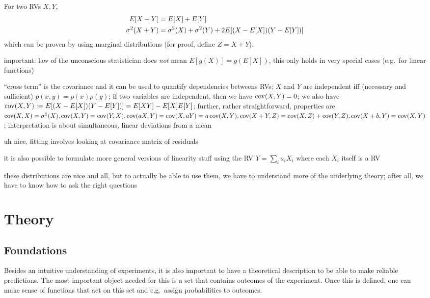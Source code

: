 \begin{prop}
For two RVs $X, Y$,
\begin{align}
E[X + Y] &= E[X] + E[Y]
\\
\sigma^2(X + Y) &= \sigma^2(X) + \sigma^2(Y) + 2 E\qty[(X - E[X]) (Y - E[Y])]
\end{align}
which can be proven by using marginal distributions (for proof, define $Z = X + Y$).
\end{prop}

important: law of the unconscious statistician does \emph{not} mean $E[g(X)] = g(E[X])$, this only holds in very special cases (e.g.~for linear functions)

\enquote{cross term} is the covariance and it can be used to quantify dependencies betweens RVs; $X$ and $Y$ are independent iff (necessary and sufficient) $p(x, y) = p(x) p(y)$; if two variables are independent, then we have $\operatorname{cov}(X, Y) = 0$; we also have $\operatorname{cov}(X, Y) := E\qty[(X - E[X]) (Y - E[Y])] = E[X Y] - E[X] E[Y]$; further, rather straightforward, properties are $\operatorname{cov}(X, X) = \sigma^2(X), \operatorname{cov}(X, Y) = \operatorname{cov}(Y, X), \operatorname{cov}(a X, Y) = \operatorname{cov}(X, a Y) = a \operatorname{cov}(X, Y), \operatorname{cov}(X + Y, Z) = \operatorname{cov}(X, Z) + \operatorname{cov}(Y, Z), \operatorname{cov}(X + b, Y) = \operatorname{cov}(X, Y)$; interpretation is about simultaneous, linear deviations from a mean

uh nice, fitting involves looking at covariance matrix of residuals


it is also possible to formulate more general versions of linearity stuff using the RV $Y = \sum_i a_i X_i$ where each $X_i$ itself is a RV




these distributions are nice and all, but to actually be able to use them, we have to understand more of the underlying theory; after all, we have to know how to ask the right questions



\newpage

\fi

\section{Theory}
	\subsection{Foundations}
Besides an intuitive understanding of experiments, it is also important to have a theoretical description to be able to make reliable predictions. The most important object needed for this is a set that contains outcomes of the experiment. Once this is defined, one can make sense of functions that act on this set and e.g.~assign probabilities to outcomes.

